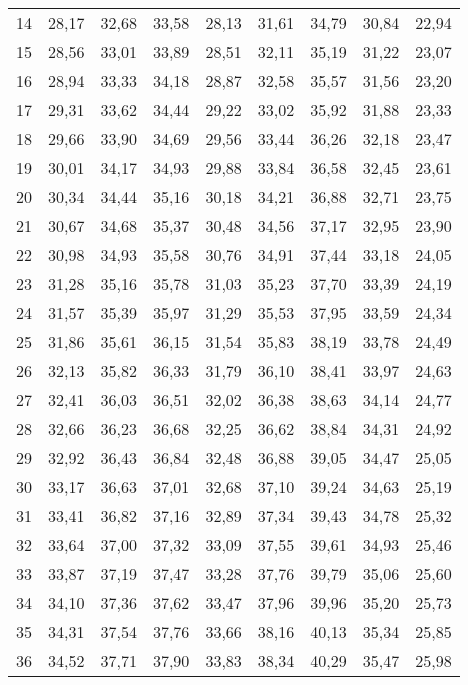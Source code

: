 \begin{longtable}{c c c c c c c c c}
      14	& 28,17	& 32,68	& 33,58	& 28,13	& 31,61	& 34,79	& 30,84	& 22,94 \\
      15	& 28,56	& 33,01	& 33,89	& 28,51	& 32,11	& 35,19	& 31,22	& 23,07 \\
      16	& 28,94	& 33,33	& 34,18	& 28,87	& 32,58	& 35,57	& 31,56	& 23,20 \\
      17	& 29,31	& 33,62	& 34,44	& 29,22	& 33,02	& 35,92	& 31,88	& 23,33 \\
      18	& 29,66	& 33,90	& 34,69	& 29,56	& 33,44	& 36,26	& 32,18	& 23,47 \\
      19	& 30,01	& 34,17	& 34,93	& 29,88	& 33,84	& 36,58	& 32,45	& 23,61 \\
      20	& 30,34	& 34,44	& 35,16	& 30,18	& 34,21	& 36,88	& 32,71	& 23,75 \\
      21	& 30,67	& 34,68	& 35,37	& 30,48	& 34,56	& 37,17	& 32,95	& 23,90 \\
      22	& 30,98	& 34,93	& 35,58	& 30,76	& 34,91	& 37,44	& 33,18	& 24,05 \\
      23	& 31,28	& 35,16	& 35,78	& 31,03	& 35,23	& 37,70	& 33,39	& 24,19 \\
      24	& 31,57	& 35,39	& 35,97	& 31,29	& 35,53	& 37,95	& 33,59	& 24,34 \\
      25	& 31,86	& 35,61	& 36,15	& 31,54	& 35,83	& 38,19	& 33,78	& 24,49 \\
      26	& 32,13	& 35,82	& 36,33	& 31,79	& 36,10	& 38,41	& 33,97	& 24,63 \\
      27	& 32,41	& 36,03	& 36,51	& 32,02	& 36,38	& 38,63	& 34,14	& 24,77 \\
      28	& 32,66	& 36,23	& 36,68	& 32,25	& 36,62	& 38,84	& 34,31	& 24,92 \\
      29	& 32,92	& 36,43	& 36,84	& 32,48	& 36,88	& 39,05	& 34,47	& 25,05 \\
      30	& 33,17	& 36,63	& 37,01	& 32,68	& 37,10	& 39,24	& 34,63	& 25,19 \\
      31	& 33,41	& 36,82	& 37,16	& 32,89	& 37,34	& 39,43	& 34,78	& 25,32 \\
      32	& 33,64	& 37,00	& 37,32	& 33,09	& 37,55	& 39,61	& 34,93	& 25,46 \\
      33	& 33,87	& 37,19	& 37,47	& 33,28	& 37,76	& 39,79	& 35,06	& 25,60 \\
      34	& 34,10	& 37,36	& 37,62	& 33,47	& 37,96	& 39,96	& 35,20	& 25,73 \\
      35	& 34,31	& 37,54	& 37,76	& 33,66	& 38,16	& 40,13	& 35,34	& 25,85 \\
      36	& 34,52	& 37,71	& 37,90	& 33,83	& 38,34	& 40,29	& 35,47	& 25,98 \\

\end{longtable}
